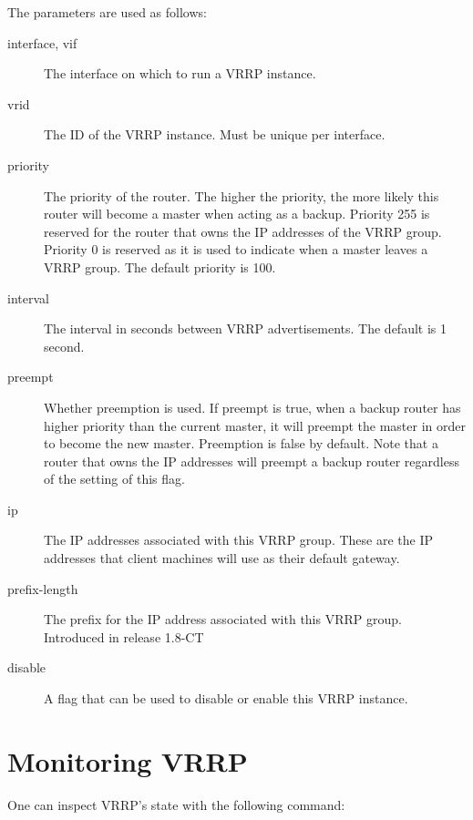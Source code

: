 \noindent
The parameters are used as follows:
\begin{description}
\item[interface, vif] The interface on which to run a VRRP instance.

\item[vrid] The ID of the VRRP instance.  Must be unique per interface.

\item[priority] The priority of the router.  The higher the priority, the more
likely this router will become a master when acting as a backup.  Priority 255
is reserved for the router that owns the IP addresses of the VRRP group.
Priority 0 is reserved as it is used to indicate when a master leaves a VRRP
group.  The default priority is 100.

\item[interval]  The interval in seconds between VRRP advertisements.  The
default is 1 second.

\item[preempt]  Whether preemption is used.  If preempt is true, when a backup
router has higher priority than the current master, it will preempt the master
in order to become the new master.  Preemption is false by default.  Note that a
router that owns the IP addresses will preempt a backup router regardless of the
setting of this flag.

\item[ip]  The IP addresses associated with this VRRP group.  These are the IP
addresses that client machines will use as their default gateway.

\item[prefix-length]  The prefix for the IP address associated with this VRRP group.
Introduced in release 1.8-CT

\item[disable]  A flag that can be used to disable or enable this VRRP instance.
\end{description}

\section{Monitoring VRRP}
One can inspect VRRP's state with the following command:

